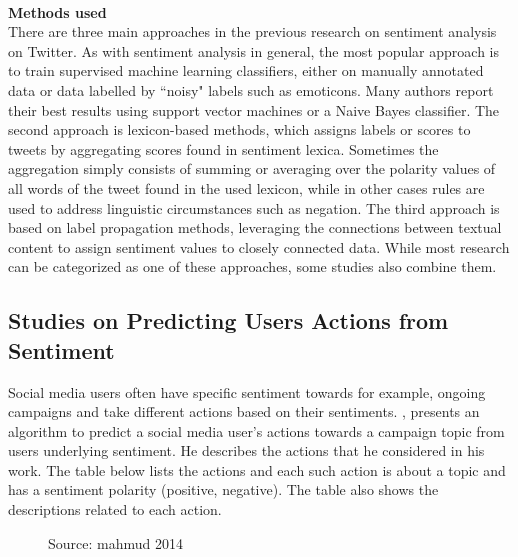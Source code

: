 \leavevmode\\
\textbf{Methods used}\\
There are three main approaches in the previous research on sentiment analysis on Twitter. As
with sentiment analysis in general, the most popular approach is to train supervised machine
learning classifiers, either on manually annotated data or data labelled by “noisy" labels such as
emoticons. Many authors report their best results using support vector machines or a Naive Bayes
classifier. The second approach is lexicon-based methods, which assigns labels or scores to tweets
by aggregating scores found in sentiment lexica. Sometimes the aggregation simply consists of
summing or averaging over the polarity values of all words of the tweet found in the used lexicon,
while in other cases rules are used to address linguistic circumstances such as negation. The third
approach is based on label propagation methods, leveraging the connections between textual
content to assign sentiment values to closely connected data. While most research can be
categorized as one of these approaches, some studies also combine them.

\subsection{Studies on Predicting Users Actions from Sentiment}
Social media users often have specific sentiment towards for example, ongoing campaigns and
take different actions based on their sentiments. \cite{ref38}, presents an algorithm to predict
a social media user's actions towards a campaign topic from user\textquotesingle s underlying sentiment. He describes the actions that he considered in his work. The table below lists the actions and each such
action is about a topic and has a sentiment polarity (positive, negative). The table also shows the
descriptions related to each action.


\begin{figure}[h]
  \centering
  \caption[Example figure]%
  {Source: mahmud 2014}
  \label{fig:ALAP:sm1}
\end{figure}


